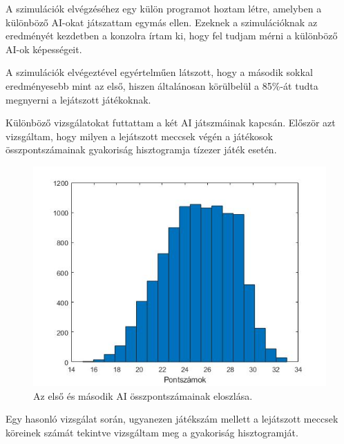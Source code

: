 
A szimulációk elvégzéséhez egy külön programot hoztam létre, amelyben a különböző AI-okat játszattam egymás ellen. Ezeknek a szimulációknak az eredményét kezdetben a konzolra írtam ki, hogy fel tudjam mérni a különböző AI-ok képességeit.

A szimulációk elvégeztével egyértelműen látszott, hogy a második sokkal eredményesebb mint az első, hiszen általánosan körülbelül a 85\%-át tudta megnyerni a lejátszott játékoknak.\par
Különböző vizsgálatokat futtattam a két AI játszmáinak kapcsán. Először azt vizsgáltam, hogy milyen a lejátszott meccsek végén a játékosok összpontszámainak gyakoriság hisztogramja tízezer játék esetén.

\begin{figure}[h]
\centering
\includegraphics[scale=0.6]{images/final_scores_AI1vsAI2.jpg}
\caption{Az első és második AI összpontszámainak eloszlása.}
\label{fig:scores1v2}
\end{figure}

\newpage
Egy hasonló vizsgálat során, ugyanezen játékszám mellett a lejátszott meccsek köreinek számát tekintve vizsgáltam meg a gyakoriság hisztogramját.

